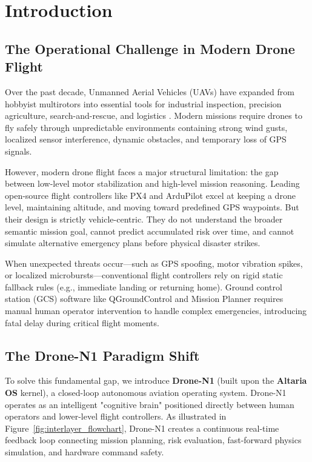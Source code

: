 \documentclass[pdflatex,sn-mathphys-num]{sn-jnl}%
\theoremstyle{thmstyleone}%
\theoremstyle{thmstyletwo}%
\theoremstyle{thmstylethree}%
\begin{document}

\maketitle

\section{Introduction}\label{sec:intro}

\subsection{The Operational Challenge in Modern Drone Flight}
Over the past decade, Unmanned Aerial Vehicles (UAVs) have expanded from hobbyist multirotors into essential tools for industrial inspection, precision agriculture, search-and-rescue, and logistics \cite{floreano2015science}. Modern missions require drones to fly safely through unpredictable environments containing strong wind gusts, localized sensor interference, dynamic obstacles, and temporary loss of GPS signals.

However, modern drone flight faces a major structural limitation: the gap between low-level motor stabilization and high-level mission reasoning. Leading open-source flight controllers like PX4 \cite{meier2011pixhawk} and ArduPilot \cite{ardupilot2024} excel at keeping a drone level, maintaining altitude, and moving toward predefined GPS waypoints. But their design is strictly vehicle-centric. They do not understand the broader semantic mission goal, cannot predict accumulated risk over time, and cannot simulate alternative emergency plans before physical disaster strikes.

When unexpected threats occur---such as GPS spoofing, motor vibration spikes, or localized microbursts---conventional flight controllers rely on rigid static fallback rules (e.g., immediate landing or returning home). Ground control station (GCS) software like QGroundControl \cite{qgroundcontrol2024} and Mission Planner \cite{oborne2024mission} requires manual human operator intervention to handle complex emergencies, introducing fatal delay during critical flight moments.

\subsection{The Drone-N1 Paradigm Shift}
To solve this fundamental gap, we introduce \textbf{Drone-N1} (built upon the \textbf{Altaria OS} kernel), a closed-loop autonomous aviation operating system. Drone-N1 operates as an intelligent "cognitive brain" positioned directly between human operators and lower-level flight controllers. As illustrated in Figure~\ref{fig:interlayer_flowchart}, Drone-N1 creates a continuous real-time feedback loop connecting mission planning, risk evaluation, fast-forward physics simulation, and hardware command safety.
\end{document}
